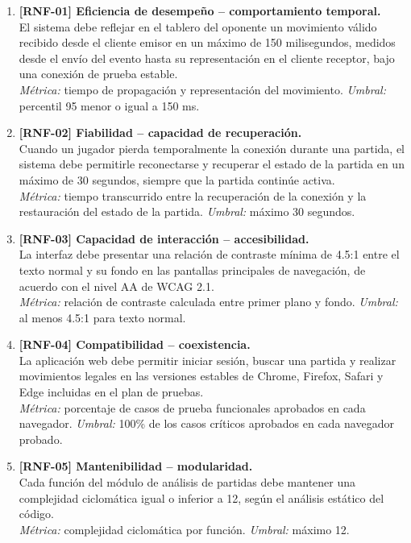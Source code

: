 \documentclass[12pt,a4paper]{article}
\begin{document}
\begin{enumerate}[leftmargin=*]
    \item \textbf{[RNF-01] Eficiencia de desempeño -- comportamiento temporal.}\\
    El sistema debe reflejar en el tablero del oponente un movimiento válido recibido desde el cliente emisor en un máximo de 150 milisegundos, medidos desde el envío del evento hasta su representación en el cliente receptor, bajo una conexión de prueba estable.\\
    \textit{Métrica:} tiempo de propagación y representación del movimiento. \textit{Umbral:} percentil 95 menor o igual a 150 ms.

    \item \textbf{[RNF-02] Fiabilidad -- capacidad de recuperación.}\\
    Cuando un jugador pierda temporalmente la conexión durante una partida, el sistema debe permitirle reconectarse y recuperar el estado de la partida en un máximo de 30 segundos, siempre que la partida continúe activa.\\
    \textit{Métrica:} tiempo transcurrido entre la recuperación de la conexión y la restauración del estado de la partida. \textit{Umbral:} máximo 30 segundos.

    \item \textbf{[RNF-03] Capacidad de interacción -- accesibilidad.}\\
    La interfaz debe presentar una relación de contraste mínima de 4.5:1 entre el texto normal y su fondo en las pantallas principales de navegación, de acuerdo con el nivel AA de WCAG 2.1.\\
    \textit{Métrica:} relación de contraste calculada entre primer plano y fondo. \textit{Umbral:} al menos 4.5:1 para texto normal.

    \item \textbf{[RNF-04] Compatibilidad -- coexistencia.}\\
    La aplicación web debe permitir iniciar sesión, buscar una partida y realizar movimientos legales en las versiones estables de Chrome, Firefox, Safari y Edge incluidas en el plan de pruebas.\\
    \textit{Métrica:} porcentaje de casos de prueba funcionales aprobados en cada navegador. \textit{Umbral:} 100\% de los casos críticos aprobados en cada navegador probado.

    \item \textbf{[RNF-05] Mantenibilidad -- modularidad.}\\
    Cada función del módulo de análisis de partidas debe mantener una complejidad ciclomática igual o inferior a 12, según el análisis estático del código.\\
    \textit{Métrica:} complejidad ciclomática por función. \textit{Umbral:} máximo 12.
\end{enumerate}
\end{document}
